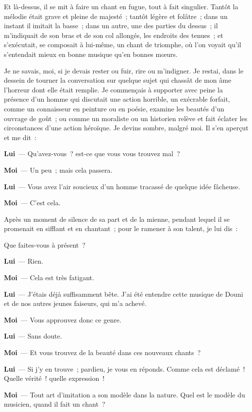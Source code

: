 \documentclass[french,twoside]{book} %
\newcommand{\labelchar}[1]{\textbf{\color{rubric} #1}}
\begin{document}
Et là-dessus, il se mit à faire un chant en fugue, tout à fait singulier. Tantôt la mélodie était grave et pleine de majesté ; tantôt légère et folâtre ; dans un instant il imitait la basse ; dans un autre, une des parties du dessus ; il m’indiquait de son bras et de son col allongés, les endroits des tenues ; et s’exécutait, se composait à lui-même, un chant de triomphe, où l’on voyait qu’il s’entendait mieux en bonne musique qu’en bonnes mœurs.\par
Je ne savais, moi, si je devais rester ou fuir, rire ou m’indigner. Je restai, dans le dessein de tourner la conversation sur quelque sujet qui chassât de mon âme l’horreur dont elle était remplie. Je commençais à supporter avec peine la présence d’un homme qui discutait une action horrible, un exécrable forfait, comme un connaisseur en peinture ou en poésie, examine les beautés d’un ouvrage de goût ; ou comme un moraliste ou un historien relève et fait éclater les circonstances d’une action héroïque. Je devins sombre, malgré moi. Il s’en aperçut et me dit :\par
\labelchar{Lui} — Qu’avez-vous ? est-ce que vous vous trouvez mal ?\par
\labelchar{Moi} — Un peu ; mais cela passera.\par
\labelchar{Lui} — Vous avez l’air soucieux d’un homme tracassé de quelque idée fâcheuse.\par
\labelchar{Moi} — C’est cela.\par
Après un moment de silence de sa part et de la mienne, pendant lequel il se promenait en sifflant et en chantant ; pour le ramener à son talent, je lui dis :\par
Que faites-vous à présent ?\par
\labelchar{Lui} — Rien.\par
\labelchar{Moi} — Cela est très fatigant.\par
\labelchar{Lui} — J’étais déjà suffisamment bête. J’ai été entendre cette musique de Douni et de nos autres jeunes faiseurs, qui m’a achevé.\par
\labelchar{Moi} — Vous approuvez donc ce genre.\par
\labelchar{Lui} — Sans doute.\par
\labelchar{Moi} — Et vous trouvez de la beauté dans ces nouveaux chants ?\par
\labelchar{Lui} — Si j’y en trouve ; pardieu, je vous en réponds. Comme cela est déclamé ! Quelle vérité ! quelle expression !\par
\labelchar{Moi} — Tout art d’imitation a son modèle dans la nature. Quel est le modèle du musicien, quand il fait un chant ?\par
\end{document}
